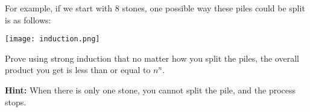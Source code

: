 \documentclass[12pt]{exam}
\begin{document}
For example, if we start with 8 stones, one possible way these piles could be split is as follows:

\begin{center}\texttt{[image: induction.png]}\end{center}

Prove using strong induction that no matter how you split the piles, the overall product you get is less than or equal to $n^ n$.

\textbf{Hint:} When there is only one stone, you cannot split the pile, and the process stops.

\begin{solution}

\end{solution}
\end{document}
